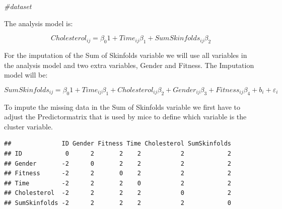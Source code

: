 \documentclass[]{book}
\newenvironment{Shaded}{\begin{snugshade}}{\end{snugshade}}
\newcommand{\KeywordTok}[1]{\textcolor[rgb]{0.13,0.29,0.53}{\textbf{#1}}}
\newcommand{\DataTypeTok}[1]{\textcolor[rgb]{0.13,0.29,0.53}{#1}}
\newcommand{\DecValTok}[1]{\textcolor[rgb]{0.00,0.00,0.81}{#1}}
\newcommand{\StringTok}[1]{\textcolor[rgb]{0.31,0.60,0.02}{#1}}
\newcommand{\CommentTok}[1]{\textcolor[rgb]{0.56,0.35,0.01}{\textit{#1}}}
\newcommand{\OperatorTok}[1]{\textcolor[rgb]{0.81,0.36,0.00}{\textbf{#1}}}
\newcommand{\NormalTok}[1]{#1}
\theoremstyle{definition}
\theoremstyle{definition}
\theoremstyle{definition}
\theoremstyle{remark}
\begin{document}
\begin{Shaded}
\begin{Highlighting}[]
\CommentTok{#dataset}
\end{Highlighting}
\end{Shaded}

The analysis model is:

\[Cholesterol_{ij} = \beta_0 1 + Time_{ij}\beta_1 + SumSkinfolds_{ij}\beta_2\]

For the imputation of the Sum of Skinfolds variable we will use all
variables in the analysis model and two extra variables, Gender and
Fitness. The Imputation model will be:

\[SumSkinfolds_{ij} = \beta_0 1 + Time_{ij}\beta_1 + Cholesterol_{ij}\beta_2 + Gender_{ij}\beta_3 + Fitness_{ij}\beta_4 + b_i + \varepsilon_i\]

To impute the missing data in the Sum of Skinfolds variable we first
have to adjust the Predictormatrix that is used by mice to define which
variable is the cluster variable.

\begin{Shaded}
\end{Shaded}

\begin{verbatim}
##              ID Gender Fitness Time Cholesterol SumSkinfolds
## ID            0      2       2    2           2            2
## Gender       -2      0       2    2           2            2
## Fitness      -2      2       0    2           2            2
## Time         -2      2       2    0           2            2
## Cholesterol  -2      2       2    2           0            2
## SumSkinfolds -2      2       2    2           2            0
\end{verbatim}
\end{document}
